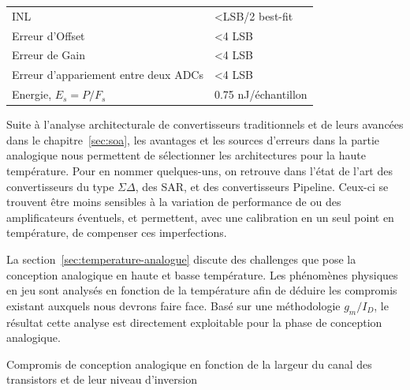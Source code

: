 \begin{mdframed}[linecolor=Prune,linewidth=1]
\begin{center}
\begin{tabular}{ll}
    INL                              & \textless LSB/2 best-fit                                                                                                                             \\
    Erreur d'Offset                     & \textless 4 LSB                                                                                                                                             \\
    Erreur de Gain                       & \textless 4 LSB                                                                                                                                             \\
    Erreur d'appariement entre deux ADCs      & \textless 4 LSB                                                                                                                                             \\
    Energie, $E_s = P/F_s$            & 0.75 nJ/échantillon      \\ \bottomrule                                                                                                                                       
    \end{tabular}
\end{center}

Suite à l’analyse architecturale de convertisseurs traditionnels et de leurs avancées dans le chapitre~\ref{sec:soa}, les avantages et les sources d’erreurs dans la partie analogique nous permettent de sélectionner les architectures pour la haute température. Pour en nommer quelques-uns, on retrouve dans l’état de l’art des convertisseurs du type \(\Sigma \Delta\), des SAR, et des convertisseurs Pipeline. Ceux-ci se trouvent être moins sensibles à la variation de performance de ou des amplificateurs éventuels, et permettent, avec une calibration en un seul point en température, de compenser ces imperfections.

La section~\ref{sec:temperature-analogue} discute des challenges que pose la conception analogique en haute et basse température. Les phénomènes physiques en jeu sont analysés en fonction de la température afin de déduire les compromis existant auxquels nous devrons faire face. Basé sur une méthodologie \(g_m/I_D\), le résultat cette analyse est directement exploitable pour la phase de conception analogique.

\begin{center}
    \centering
    
    \caption[]{Compromis de conception analogique en fonction de la largeur du canal des transistors et de leur niveau d'inversion}
    \label{fig:tradeoffs-fr}
\end{center}


\end{mdframed}
